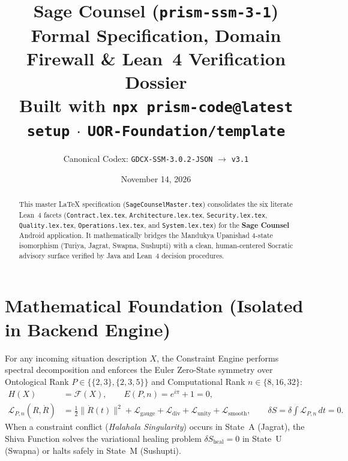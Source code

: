 \documentclass[11pt,a4paper]{article}
\title{\textbf{Sage Counsel (\texttt{prism-ssm-3-1})}\\
Formal Specification, Domain Firewall \& Lean~4 Verification Dossier\\
\large Built with \texttt{npx prism-code@latest setup} $\cdot$ \texttt{UOR-Foundation/template}}
\author{Canonical Codex: \texttt{GDCX-SSM-3.0.2-JSON} $\rightarrow$ \texttt{v3.1}}
\date{November 14, 2026}
\begin{document}
\maketitle

\begin{abstract}
This master \LaTeX{} specification (\texttt{SageCounselMaster.tex}) consolidates the six literate Lean~4 facets (\texttt{Contract.lex.tex}, \texttt{Architecture.lex.tex}, \texttt{Security.lex.tex}, \texttt{Quality.lex.tex}, \texttt{Operations.lex.tex}, and \texttt{System.lex.tex}) for the \textbf{Sage Counsel} Android application. It mathematically bridges the Mandukya Upanishad 4-state isomorphism (Turiya, Jagrat, Swapna, Sushupti) with a clean, human-centered Socratic advisory surface verified by Java and Lean~4 decision procedures.
\end{abstract}

\section{Mathematical Foundation (Isolated in Backend Engine)}
For any incoming situation description $X$, the Constraint Engine performs spectral decomposition and enforces the Euler Zero-State symmetry over Ontological Rank $P \in \{\{2,3\}, \{2,3,5\}\}$ and Computational Rank $n \in \{8, 16, 32\}$:
\begin{align}
  H(X) &= \mathcal{F}(X), \qquad E(P, n) = e^{i\pi} + 1 = 0, \\
  \mathcal{L}_{P,n}(R, \dot{R}) &= \frac{1}{2}\|\dot{R}(t)\|^2 + \mathcal{L}_{\mathrm{gauge}} + \mathcal{L}_{\mathrm{div}} + \mathcal{L}_{\mathrm{unity}} + \mathcal{L}_{\mathrm{smooth}}, \qquad \delta S = \delta \int \mathcal{L}_{P,n}\,dt = 0.
\end{align}
When a constraint conflict (\emph{Halahala Singularity}) occurs in State~A (Jagrat), the Shiva Function solves the variational healing problem $\delta S_{\mathrm{heal}} = 0$ in State~U (Swapna) or halts safely in State~M (Sushupti).
\end{document}
